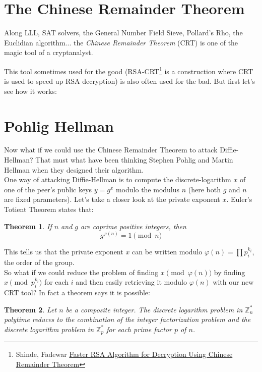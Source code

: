 \documentclass[a4paper,11pt,twocolumn]{article}
\newtheorem{theorem}{Theorem}
\begin{document}
\newpage

\appendix 

\section{The Chinese Remainder Theorem}

Along LLL, SAT solvers, the General Number Field Sieve, Pollard's Rho, the Euclidian algorithm... the \emph{Chinese Remainder Theorem} (CRT) is one of the magic tool of a cryptanalyst.

This tool sometimes used for the good (RSA-CRT\footnote{ Shinde, Fadewar \href{http://www.techscience.com/doi/10.3970/icces.2008.005.255.pdf}{Faster RSA Algorithm for Decryption Using Chinese
Remainder Theorem}}\cite{fasterRSA} is a construction where CRT is used to speed up RSA decryption) is also often used for the bad. But first let's see how it works:



\section{Pohlig Hellman}

Now what if we could use the Chinese Remainder Theorem to attack Diffie-Hellman? That must what have been thinking Stephen Pohlig and Martin Hellman when they designed their algorithm.\\

One way of attacking Diffie-Hellman is to compute the discrete-logarithm $x$ of one of the peer's public keys $y = g^{x}$ modulo the modulus $n$ (here both $g$ and $n$ are fixed parameters). Let's take a closer look at the private exponent $x$. Euler's Totient Theorem states that:

\begin{theorem}
If $n$ and $g$ are coprime positive integers, then
\[ g^{\varphi(n)} = 1 \pmod{n} \]
\end{theorem}

This tells us that the private exponent $x$ can be written modulo $\varphi(n) = \prod p_i^{k_i}$, the order of the group.\\

So what if we could reduce the problem of finding $x \pmod{\varphi(n)}$ by finding $x \pmod{p_i^{k_i}}$ for each $i$ and then easily retrieving it modulo $\varphi(n)$ with our new CRT tool? In fact a theorem says it is possible:

\begin{theorem}
Let $n$ be a composite integer. The discrete logarithm problem in $\mathbb{Z}^*_n$ polytime reduces to the combination of the integer factorization problem and the discrete logarithm problem in $\mathbb{Z}^*_p$ for each prime factor $p$ of $n$.
\end{theorem}
\end{document}
